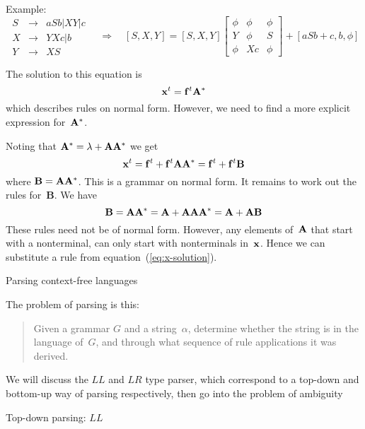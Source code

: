 Example:
\[
\begin{array}{ccl}
S&\rightarrow &aSb|XY|c\\
X&\rightarrow &YXc|b\\
Y&\rightarrow &XS
  \end{array}\quad\Rightarrow\quad
   [S,X,Y]=[S,X,Y]\left[
                \begin{array}{ccc}\phi&\phi&\phi\\
                  Y&\phi&S\\ \phi&Xc&\phi \end{array}\right]
                +[aSb+c,b,\phi]
\]

The solution to this equation is
\[ \mathbf{x}^t = \mathbf{f}^t\mathbf{A}^* \]
which describes rules on normal form. However,
we need to find a more explicit expression for~$\mathbf{A}^*$.

Noting that $\mathbf{A}^*=\lambda+\mathbf{A}\mathbf{A}^*$ we get
\begin{equation}
 \mathbf{x}^t = \mathbf{f}^t+\mathbf{f}^t\mathbf{A}\mathbf{A}^*
  =  \mathbf{f}^t+\mathbf{f}^t\mathbf{B}
    \label{eq:x-solution}\end{equation}
where $\mathbf{B}=\mathbf{A}\mathbf{A}^*$. This is a grammar on normal
form. It remains to work out the rules for~$\mathbf{B}$. We have
\[ \mathbf{B}=\mathbf{A}\mathbf{A}^*=
  \mathbf{A}+\mathbf{A}\mathbf{A}\mathbf{A}^* =
  \mathbf{A}+\mathbf{A}\mathbf{B} \]
These rules need not be of normal
form. However, any elements of~$\mathbf{A}$ that start with a
nonterminal, can only start with nonterminals in~$\mathbf{x}$. Hence
we can substitute a rule from equation~(\ref{eq:x-solution}).

 {Parsing context-free languages}
\label{sec:pparsing}

The problem of parsing is this:
\begin{quotation}Given a grammar $G$ and a string~$\alpha$, determine
  whether the string is in the language of~$G$, and through what
  sequence of rule applications it was derived.
\end{quotation}
We will discuss the $LL$ and $LR$ type parser, which correspond to a
top-down and bottom-up way of parsing respectively, then go into 
the problem of ambiguity

 {Top-down parsing: $LL$}


